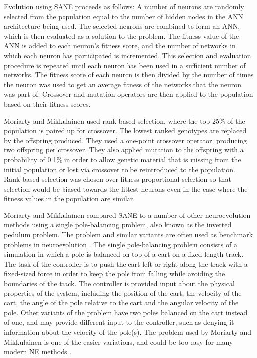 \documentclass[12pt]{article} %
\begin{document}
Evolution using SANE proceeds as follows: A number of neurons are randomly selected from the population equal to the number of hidden nodes in the ANN architecture being used. The selected neurons are combined to form an ANN, which is then evaluated as a solution to the problem. The fitness value of the ANN is added to each neuron's fitness score, and the number of networks in which each neuron has participated is incremented. This selection and evaluation procedure is repeated until each neuron has been used in a sufficient number of networks. The fitness score of each neuron is then divided by the number of times the neuron was used to get an average fitness of the networks that the neuron was part of. Crossover and mutation operators are then applied to the population based on their fitness scores.

Moriarty and Mikkulainen used rank-based selection, where the top 25\% of the population is paired up for crossover. The lowest ranked genotypes are replaced by the offspring produced. They used a one-point crossover operator, producing two offspring per crossover. They also applied mutation to the offspring with a probability of 0.1\% in order to allow genetic material that is missing from the initial population or lost via crossover to be reintroduced to the population. Rank-based selection was chosen over fitness-proportional selection so that selection would be biased towards the fittest neurons even in the case where the fitness values in the population are similar.

Moriarty and Mikkulainen compared SANE to a number of other neuroevolution methods using a single pole-balancing problem, also known as the inverted pedulum problem. The problem and similar variants are often used as benchmark problems in neuroevolution \cite{Gomez1997}\cite{Igel2003}\cite{Stanley2002}. The single pole-balancing problem consists of a simulation in which a pole is balanced on top of a cart on a fixed-length track. The task of the controller is to push the cart left or right along the track with a fixed-sized force in order to keep the pole from falling while avoiding the boundaries of the track. The controller is provided input about the physical properties of the system, including the position of the cart, the velocity of the cart, the angle of the pole relative to the cart and the angular velocity of the pole. Other variants of the problem have two poles balanced on the cart instead of one, and may provide different input to the controller, such as denying it information about the velocity of the pole(s). The problem used by Moriarty and Mikkulainen is one of the easier variations, and could be too easy for many modern NE methods \cite{Stanley2002}.
\end{document}
